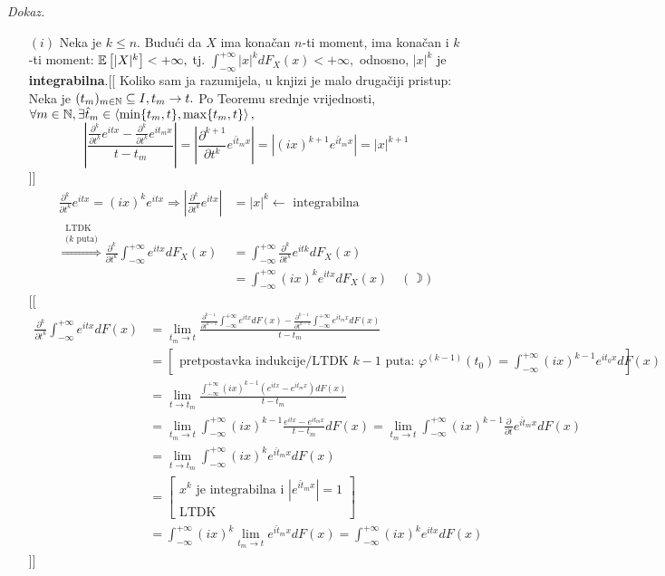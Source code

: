 \documentclass{article}
\begin{document}
\textit{Dokaz.}
\begin{enumerate}
    \item[\((i)\)] Neka je \(k\le n.\) Budući da \(X\) ima konačan \(n\)-ti moment, ima konačan i \(k\)-ti moment: \(\Bbb E\left[|X|^k\right]<+\infty,\) tj. \(\int_{-\infty}^{+\infty}|x|^kdF_X(x)<+\infty,\) odnosno, \(|x|^k\) je \textbf{integrabilna}.\newline \textcolor{NavyBlue}{[[ Koliko sam ja razumijela, u knjizi je malo drugačiji pristup: Neka je \((t_m)_{m\in\Bbb N}\subseteq I,t_m\to t.\) Po Teoremu srednje vrijednosti, \(\forall m\in\Bbb N,\exists\hat t_m\in\left\langle\min\{t_m,t\},\max\{t_m,t\}\right\rangle,\) \[\left|\frac{\frac{\partial^k}{\partial t^k}e^{itx}-\frac{\partial^k}{\partial t^k}e^{it_mx}}{t-t_m}\right|=\left|\frac{\partial^{k+1}}{\partial t^k}e^{i\hat t_mx}\right|=\left|(ix)^{k+1}e^{i\hat t_mx}\right|=|x|^{k+1}\]]]}  \[\begin{aligned}\frac{\partial^k}{\partial t^k}e^{itx}=(ix)^ke^{itx}\Rightarrow\left|\frac{\partial^k}{\partial t^k}e^{itx}\right|&=|x|^k\leftarrow\text{ integrabilna}\\\overset{\substack{\text{LTDK}\\\text{(}k\text{ puta)}}}{\Rightarrow}\frac{\partial^k}{\partial t^k}\int_{-\infty}^{+\infty}e^{itx}dF_X(x)&=\int_{-\infty}^{+\infty}\frac{\partial^k}{\partial t^k}e^{itk}dF_X(x)\\&=\int_{-\infty}^{+\infty}(ix)^ke^{itx}dF_X(x)\quad(\rightmoon)\end{aligned}\] \textcolor{NavyBlue}{[[\[\begin{aligned}\frac{\partial^k}{\partial t^k}\int_{-\infty}^{+\infty}e^{itx}dF(x)&=\lim_{t_m\to t}\frac{\frac{\partial^{k-1}}{\partial t^{k-1}}\int_{-\infty}^{+\infty}e^{itx}dF(x)-\frac{\partial^{k-1}}{\partial t^{k-1}}\int_{-\infty}^{+\infty}e^{it_mx}dF(x)}{t-t_m}\\&=\begin{bmatrix}\text{pretpostavka indukcije/LTDK }k-1\text{ puta: }\varphi^{(k-1)}(t_0)=\int_{-\infty}^{+\infty}(ix)^{k-1}e^{it_0x}dF(x)\end{bmatrix}\\&=\lim_{t\to t_m}\frac{\int_{-\infty}^{+\infty}(ix)^{k-1}\left(e^{itx}-e^{it_mx}\right)dF(x)}{t-t_m}\\&=\lim_{t_m\to t}\int_{-\infty}^{+\infty}(ix)^{k-1}\frac{e^{itx}-e^{it_mx}}{t-t_m}dF(x)=\lim_{t_m\to t}\int_{-\infty}^{+\infty}(ix)^{k-1}\frac{\partial}{\partial t}e^{i\hat t_mx}dF(x)\\&=\lim_{t\to t_m}\int_{-\infty}^{+\infty}(ix)^ke^{i\hat t_mx}dF(x)\\&=\begin{bmatrix}x^k\text{ je integrabilna i }\left|e^{i\hat t_m x}\right|=1\\\text{LTDK}\end{bmatrix}\\&=\int_{-\infty}^{+\infty}(ix)^k\lim_{t_m\to t}e^{i\hat t_m x}dF(x)=\int_{-\infty}^{+\infty}(ix)^ke^{itx}dF(x)\end{aligned}\]]]}

\end{enumerate}
\end{document}
